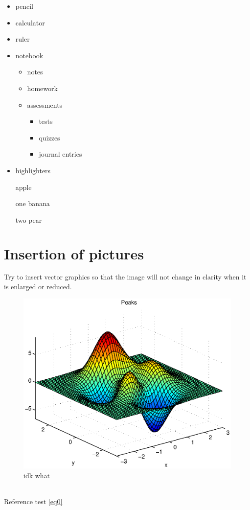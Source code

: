 \documentclass[12pt]{article}
\begin{document}
\vspace{1cm}

\begin{itemize}
    \item pencil
    \item calculator
    \item ruler
    \item notebook
        \begin{itemize}
            \item notes
            \item homework
            \item assessments
            \begin{itemize}
                \item tests
                \item quizzes
                \item journal entries
            \end{itemize}
        \end{itemize}
    \item highlighters
\end{itemize}

\vspace{1cm}

\begin{enumerate}
    \item []apple
    \item [one]banana
    \item [two]pear
\end{enumerate}

\section{Insertion of pictures}
Try to insert vector graphics\cite{mckay2002role} so that the image will not change in clarity when it is enlarged or reduced.
\begin{figure}[htbp]
    \includegraphics[width=12cm]{mcmthesis-aaa.eps}
    \caption{idk what}
    \label{fig:a}
\end{figure}
\\Reference test \autoref{eq0}
\end{document}

